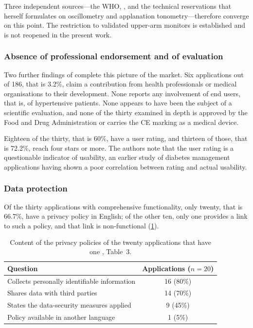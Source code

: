 \documentclass[12pt,a4paper,oneside]{report}
\begin{document}
Three independent sources---the WHO, \textcite{alessa2019}, and the technical reservations that \textcite{navarro2023} herself formulates on oscillometry and applanation tonometry---therefore converge on this point. The restriction to validated upper-arm monitors is established and is not reopened in the present work.

\subsubsection{Absence of professional endorsement and of evaluation}

Two further findings of \textcite{alessa2019} complete this picture of the market. Six applications out of 186, that is 3.2\%, claim a contribution from health professionals or medical organisations to their development. None reports any involvement of end users, that is, of hypertensive patients. None appears to have been the subject of a scientific evaluation, and none of the thirty examined in depth is approved by the Food and Drug Administration or carries the CE marking as a medical device.

Eighteen of the thirty, that is 60\%, have a user rating, and thirteen of those, that is 72.2\%, reach four stars or more. The authors note that the user rating is a questionable indicator of usability, an earlier study of diabetes management applications having shown a poor correlation between rating and actual usability.

\subsubsection{Data protection}

Of the thirty applications with comprehensive functionality, only twenty, that is 66.7\%, have a privacy policy in English; of the other ten, only one provides a link to such a policy, and that link is non-functional (\cref{tab:privacy}).

\begin{table}[htbp]
\centering\small
\caption{Content of the privacy policies of the twenty applications that have one \parencite{alessa2019}, Table~3.}\label{tab:privacy}
\begin{tabularx}{\textwidth}{@{}X c@{}}
\toprule
\textbf{Question} & \textbf{Applications ($n=20$)} \\
\midrule
Collects personally identifiable information & 16 (80\%) \\
Shares data with third parties & 14 (70\%) \\
States the data-security measures applied & 9 (45\%) \\
Policy available in another language & 1 (5\%) \\
\bottomrule
\end{tabularx}
\end{table}
\end{document}
